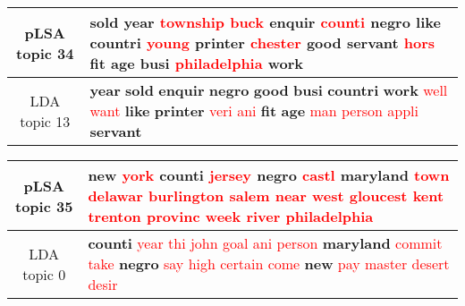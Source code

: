 \begin{center}\begin{tabularx}{\textwidth} {
  | c | >{\raggedright\arraybackslash}X | } \hline 
pLSA topic 34 & \textbf{sold} \textbf{year} \textcolor{red}{township} \textcolor{red}{buck} \textbf{enquir} \textcolor{red}{counti} \textbf{negro} \textbf{like} \textbf{countri} \textcolor{red}{young} \textbf{printer} \textcolor{red}{chester} \textbf{good} \textbf{servant} \textcolor{red}{hors} \textbf{fit} \textbf{age} \textbf{busi} \textcolor{red}{philadelphia} \textbf{work} \\ \hline 
LDA topic 13 & \textbf{year} \textbf{sold} \textbf{enquir} \textbf{negro} \textbf{good} \textbf{busi} \textbf{countri} \textbf{work} \textcolor{red}{well} \textcolor{red}{want} \textbf{like} \textbf{printer} \textcolor{red}{veri} \textcolor{red}{ani} \textbf{fit} \textbf{age} \textcolor{red}{man} \textcolor{red}{person} \textcolor{red}{appli} \textbf{servant} \\ \hline 
\end{tabularx}

\end{center}

\begin{center}\begin{tabularx}{\textwidth} {
  | c | >{\raggedright\arraybackslash}X | } \hline 
pLSA topic 35 & \textbf{new} \textcolor{red}{york} \textbf{counti} \textcolor{red}{jersey} \textbf{negro} \textcolor{red}{castl} \textbf{maryland} \textcolor{red}{town} \textcolor{red}{delawar} \textcolor{red}{burlington} \textcolor{red}{salem} \textcolor{red}{near} \textcolor{red}{west} \textcolor{red}{gloucest} \textcolor{red}{kent} \textcolor{red}{trenton} \textcolor{red}{provinc} \textcolor{red}{week} \textcolor{red}{river} \textcolor{red}{philadelphia} \\ \hline 
LDA topic 0 & \textbf{counti} \textcolor{red}{year} \textcolor{red}{thi} \textcolor{red}{john} \textcolor{red}{goal} \textcolor{red}{ani} \textcolor{red}{person} \textbf{maryland} \textcolor{red}{commit} \textcolor{red}{take} \textbf{negro} \textcolor{red}{say} \textcolor{red}{high} \textcolor{red}{certain} \textcolor{red}{come} \textbf{new} \textcolor{red}{pay} \textcolor{red}{master} \textcolor{red}{desert} \textcolor{red}{desir} \\ \hline 
\end{tabularx}

\end{center}

